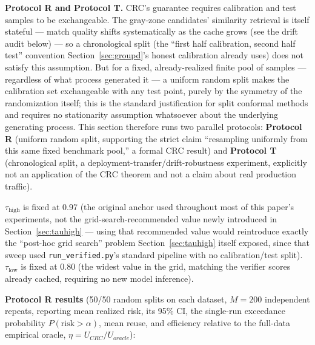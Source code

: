 \documentclass[11pt]{article}
\newcommand{\taulow}{\ensuremath{\tau_{\text{low}}}}
\newcommand{\tauhigh}{\ensuremath{\tau_{\text{high}}}}
\begin{document}
\textbf{Protocol R and Protocol T.} CRC's guarantee requires calibration and test samples to be exchangeable. The gray-zone candidates' similarity retrieval is itself stateful --- match quality shifts systematically as the cache grows (see the drift audit below) --- so a chronological split (the ``first half calibration, second half test'' convention Section~\ref{sec:groupd}'s honest calibration already uses) does not satisfy this assumption. But for a fixed, already-realized finite pool of samples --- regardless of what process generated it --- a uniform random split makes the calibration set exchangeable with any test point, purely by the symmetry of the randomization itself; this is the standard justification for split conformal methods and requires no stationarity assumption whatsoever about the underlying generating process. This section therefore runs two parallel protocols: \textbf{Protocol R} (uniform random split, supporting the strict claim ``resampling uniformly from this same fixed benchmark pool,'' a formal CRC result) and \textbf{Protocol T} (chronological split, a deployment-transfer/drift-robustness experiment, explicitly not an application of the CRC theorem and not a claim about real production traffic).

$\tauhigh$ is fixed at 0.97 (the original anchor used throughout most of this paper's experiments, not the grid-search-recommended value newly introduced in Section~\ref{sec:tauhigh} --- using that recommended value would reintroduce exactly the ``post-hoc grid search'' problem Section~\ref{sec:tauhigh} itself exposed, since that sweep used \texttt{run\_\allowbreak{}verified.\allowbreak{}py}'s standard pipeline with no calibration/test split). $\taulow$ is fixed at 0.80 (the widest value in the grid, matching the verifier scores already cached, requiring no new model inference).

\textbf{Protocol R results} (50/50 random splits on each dataset, $M=200$ independent repeats, reporting mean realized risk, its 95\% CI, the single-run exceedance probability $P(\text{risk}>\alpha)$, mean reuse, and efficiency relative to the full-data empirical oracle, $\eta = U_{CRC}/U_{oracle}$):
\end{document}
